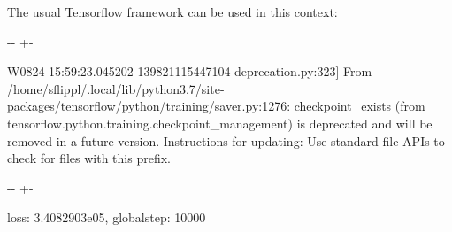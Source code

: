 \documentclass[letterpaper,10pt,english]{sphinxmanual}
\newlength\nbsphinxcodecellspacing
\begin{document}
The usual Tensorflow framework can be used in this context:

{
\begin{sphinxVerbatim}[commandchars=\\\{\}]
\llap{\color{nbsphinxin}[7]:\,\hspace{\fboxrule}\hspace{\fboxsep}}
\end{sphinxVerbatim}
}



%
{
\kern-\sphinxverbatimsmallskipamount\kern-\baselineskip
\kern+\FrameHeightAdjust\kern-\fboxrule
\vspace{\nbsphinxcodecellspacing}
%
\begin{sphinxVerbatim}[commandchars=\\\{\}]
W0824 15:59:23.045202 139821115447104 deprecation.py:323] From /home/sflippl/.local/lib/python3.7/site-packages/tensorflow/python/training/saver.py:1276: checkpoint\_exists (from tensorflow.python.training.checkpoint\_management) is deprecated and will be removed in a future version.
Instructions for updating:
Use standard file APIs to check for files with this prefix.
\end{sphinxVerbatim}
}
\relax

{

\kern-\sphinxverbatimsmallskipamount\kern-\baselineskip
\kern+\FrameHeightAdjust\kern-\fboxrule
\vspace{\nbsphinxcodecellspacing}

\begin{sphinxVerbatim}[commandchars=\\\{\}]
\llap{\color{nbsphinxout}[7]:\,\hspace{\fboxrule}\hspace{\fboxsep}}\PYGZob{}\PYGZsq{}loss\PYGZsq{}: 3.4082903e\PYGZhy{}05, \PYGZsq{}global\PYGZus{}step\PYGZsq{}: 10000\PYGZcb{}
\end{sphinxVerbatim}
}
\end{document}
